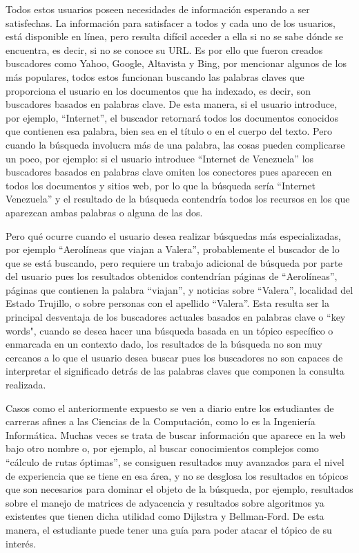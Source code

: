 Todos estos usuarios poseen necesidades de información esperando a ser satisfechas. La información para satisfacer a todos y cada uno de los usuarios, está disponible en línea, pero resulta difícil acceder a ella si no se sabe dónde se encuentra, es decir, si no se conoce su URL. Es por ello que fueron creados buscadores como Yahoo, Google, Altavista y Bing, por mencionar algunos de los más populares, todos estos funcionan buscando las palabras claves que proporciona el usuario en los documentos que ha indexado, es decir, son buscadores basados en palabras clave. De esta manera, si el usuario introduce, por ejemplo, ``Internet”, el buscador retornará todos los documentos conocidos que contienen esa palabra, bien sea en el título o en el cuerpo del texto. Pero cuando la búsqueda involucra más de una palabra, las cosas pueden complicarse un poco, por ejemplo: si el usuario introduce ``Internet de Venezuela” los buscadores basados en palabras clave omiten los conectores pues aparecen en todos los documentos y sitios web, por lo que la búsqueda sería ``Internet Venezuela” y el resultado de la búsqueda contendría todos los recursos en los que aparezcan ambas palabras o alguna de las dos.

Pero qué ocurre cuando el usuario desea realizar búsquedas más especializadas, por ejemplo ``Aerolíneas que viajan a Valera”, probablemente el buscador de lo que se está buscando, pero requiere un trabajo adicional de búsqueda por parte del usuario pues los resultados obtenidos contendrían páginas de ``Aerolíneas”, páginas que contienen la palabra ``viajan”, y noticias sobre ``Valera”, localidad del Estado Trujillo, o sobre personas con el apellido ``Valera”. Esta resulta ser la principal desventaja de los buscadores actuales basados en palabras clave o ``key words", cuando se desea hacer una búsqueda basada en un tópico específico o enmarcada en un contexto dado, los resultados de la búsqueda no son muy cercanos a lo que el usuario desea buscar pues los buscadores no son capaces de interpretar el significado detrás de las palabras claves que componen la consulta realizada.

Casos como el anteriormente expuesto se ven a diario entre los estudiantes de carreras afines a las Ciencias de la Computación, como lo es la Ingeniería Informática. Muchas veces se trata de buscar información que aparece en la web bajo otro nombre o, por ejemplo, al buscar conocimientos complejos como ``cálculo de rutas óptimas”, se consiguen resultados muy avanzados para el nivel de experiencia que se tiene en esa área, y no se desglosa los resultados en tópicos que son necesarios para dominar el objeto de la búsqueda, por ejemplo, resultados sobre el manejo de matrices de adyacencia y resultados sobre algoritmos ya existentes que tienen dicha utilidad como Dijkstra y Bellman-Ford. De esta manera, el estudiante puede tener una guía para poder atacar el tópico de su interés.

